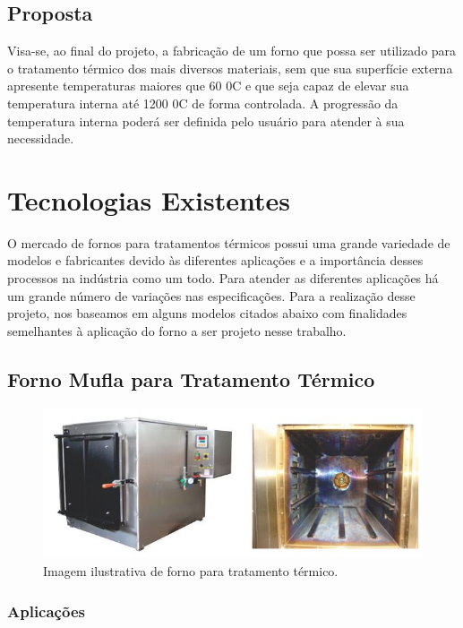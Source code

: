 \subsection{Proposta}

Visa-se, ao final do projeto, a fabricação de um forno que possa ser utilizado para o tratamento térmico dos mais diversos materiais, sem que sua superfície externa apresente temperaturas maiores que 60 0C e que seja capaz de elevar sua temperatura interna até 1200 0C de forma controlada. A progressão da temperatura interna poderá ser definida pelo usuário para atender à sua necessidade.

\section{Tecnologias Existentes}

O mercado de fornos para tratamentos térmicos possui uma grande variedade de modelos e fabricantes devido às diferentes aplicações e a importância desses processos na indústria como um todo. Para atender as diferentes aplicações há um grande número de variações nas especificações. Para a realização desse projeto, nos baseamos em alguns modelos citados abaixo com finalidades semelhantes à aplicação do forno a ser projeto nesse trabalho.

\subsection{Forno Mufla para Tratamento Térmico}

\begin{figure}[!h]
	\centering
	\label{forno_mufla}
	\includegraphics[keepaspectratio=true,scale=0.8]{figuras/forno_mufla.JPG}
	\caption{Imagem ilustrativa de forno para tratamento térmico.}
\end{figure}

\subsubsection{Aplicações}

